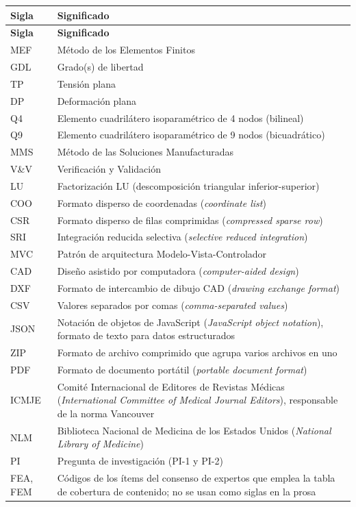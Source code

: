\begin{longtable}{@{}p{2.4cm}p{11.4cm}@{}}
\toprule
\textbf{Sigla} & \textbf{Significado} \\
\midrule
\endfirsthead
\toprule
\textbf{Sigla} & \textbf{Significado} \\
\midrule
\endhead
\bottomrule
\endfoot
MEF & Método de los Elementos Finitos \\
GDL & Grado(s) de libertad \\
TP & Tensión plana \\
DP & Deformación plana \\
Q4 & Elemento cuadrilátero isoparamétrico de 4 nodos (bilineal) \\
Q9 & Elemento cuadrilátero isoparamétrico de 9 nodos (bicuadrático) \\
MMS & Método de las Soluciones Manufacturadas \\
V\&V & Verificación y Validación \\
LU & Factorización LU (descomposición triangular inferior-superior) \\
COO & Formato disperso de coordenadas (\emph{coordinate list}) \\
CSR & Formato disperso de filas comprimidas (\emph{compressed sparse row}) \\
SRI & Integración reducida selectiva (\emph{selective reduced integration}) \\
MVC & Patrón de arquitectura Modelo-Vista-Controlador \\
CAD & Diseño asistido por computadora (\emph{computer-aided design}) \\
DXF & Formato de intercambio de dibujo CAD (\emph{drawing exchange format}) \\
CSV & Valores separados por comas (\emph{comma-separated values}) \\
JSON & Notación de objetos de JavaScript (\emph{JavaScript object notation}), formato de texto para datos estructurados \\
ZIP & Formato de archivo comprimido que agrupa varios archivos en uno \\
PDF & Formato de documento portátil (\emph{portable document format}) \\
ICMJE & Comité Internacional de Editores de Revistas Médicas (\emph{International Committee of Medical Journal Editors}), responsable de la norma Vancouver \\
NLM & Biblioteca Nacional de Medicina de los Estados Unidos (\emph{National Library of Medicine}) \\
PI & Pregunta de investigación (PI-1 y PI-2) \\
FEA, FEM & Códigos de los ítems del consenso de expertos que emplea la tabla de cobertura de contenido; no se usan como siglas en la prosa \\
\end{longtable}
\renewcommand{\arraystretch}{1.0}

\setcounter{table}{0}

